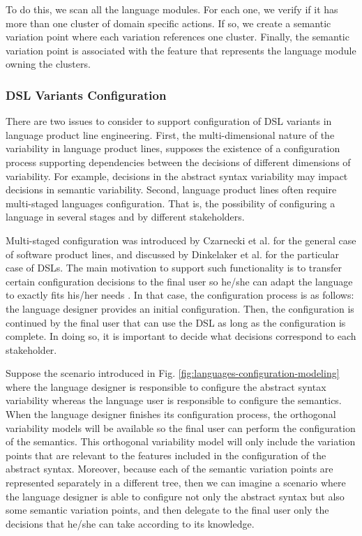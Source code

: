 To do this, we scan all the language modules. For each one, we verify if it has more than one cluster of domain specific actions. If so, we create a semantic variation point where each variation references one cluster. Finally, the semantic variation point is associated with the feature that represents the language module owning the clusters. 

\subsubsection{DSL Variants Configuration}

There are two issues to consider to support configuration of DSL variants in language product line engineering. First, the multi-dimensional nature of the variability in language product lines, supposes the existence of a configuration process supporting dependencies between the decisions of different dimensions of variability. For example, decisions in the abstract syntax variability may impact decisions in semantic variability. Second, language product lines often require multi-staged languages configuration. That is, the possibility of configuring a language in several stages and by different stakeholders.

Multi-staged configuration was introduced by Czarnecki et al. \cite{Czarnecki:2004} for the general case of software product lines, and discussed by Dinkelaker et al. \cite{Dinkelaker:2010} for the particular case of DSLs. The main motivation to support such functionality is to transfer certain configuration decisions to the final user so he/she can adapt the language to exactly fits his/her needs \cite{Dinkelaker:2010}. In that case, the configuration process is as follows: the language designer provides an initial configuration. Then, the configuration is continued by the final user that can use the DSL as long as the configuration is complete. In doing so, it is important to decide what decisions correspond to each stakeholder.

Suppose the scenario introduced in Fig. \ref{fig:languages-configuration-modeling} where the language designer is responsible to configure the abstract syntax variability whereas the language user is responsible to configure the semantics. When the language designer finishes its configuration process, the orthogonal variability models will be available so the final user can perform the configuration of the semantics. This orthogonal variability model will only include the variation points that are relevant to the features included in the configuration of the abstract syntax. Moreover, because each of the semantic variation points are represented separately in a different tree, then we can imagine a scenario where the language designer is able to configure not only the abstract syntax but also some semantic variation points, and then delegate to the final user only the decisions that he/she can take according to its knowledge. 

